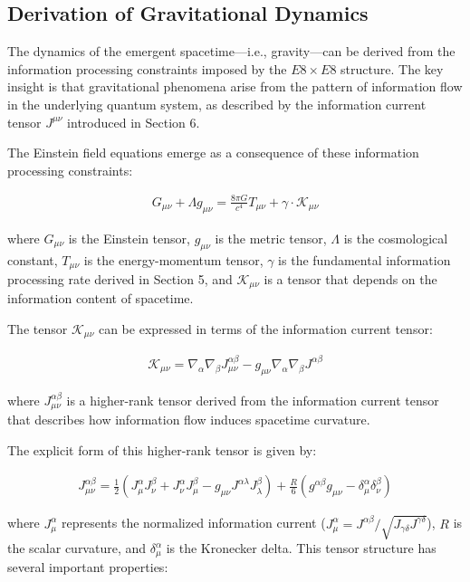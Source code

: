 \documentclass[11pt,english,twoside]{article}
\begin{document}
\subsection{Derivation of Gravitational Dynamics}

The dynamics of the emergent spacetime---i.e., gravity---can be derived from the information processing constraints imposed by the $E8\times E8$ structure. The key insight is that gravitational phenomena arise from the pattern of information flow in the underlying quantum system, as described by the information current tensor $J^{\mu\nu}$ introduced in Section 6.

The Einstein field equations emerge as a consequence of these information processing constraints:

\begin{align}
    G_{\mu\nu} + \Lambda g_{\mu\nu} = \frac{8\pi G}{c^4} T_{\mu\nu} + \gamma \cdot \mathcal{K}_{\mu\nu}
\end{align}

where $G_{\mu\nu}$ is the Einstein tensor, $g_{\mu\nu}$ is the metric tensor, $\Lambda$ is the cosmological constant, $T_{\mu\nu}$ is the energy-momentum tensor, $\gamma$ is the fundamental information processing rate derived in Section 5, and $\mathcal{K}_{\mu\nu}$ is a tensor that depends on the information content of spacetime.

The tensor $\mathcal{K}_{\mu\nu}$ can be expressed in terms of the information current tensor:

\begin{align}
    \mathcal{K}_{\mu\nu} = \nabla_\alpha \nabla_\beta J^{\alpha\beta}_{\mu\nu} - g_{\mu\nu} \nabla_\alpha \nabla_\beta J^{\alpha\beta}
\end{align}

where $J^{\alpha\beta}_{\mu\nu}$ is a higher-rank tensor derived from the information current tensor that describes how information flow induces spacetime curvature.

The explicit form of this higher-rank tensor is given by:

\begin{align}
    J^{\alpha\beta}_{\mu\nu} = \frac{1}{2}\left(J^{\alpha}_{\mu}J^{\beta}_{\nu} + J^{\alpha}_{\nu}J^{\beta}_{\mu} - g_{\mu\nu}J^{\alpha\lambda}J^{\beta}_{\lambda}\right) + \frac{R}{6}\left(g^{\alpha\beta}g_{\mu\nu} - \delta^{\alpha}_{\mu}\delta^{\beta}_{\nu}\right)
\end{align}

where $J^{\alpha}_{\mu}$ represents the normalized information current ($J^{\alpha}_{\mu} = J^{\alpha\beta}/\sqrt{J_{\gamma\delta}J^{\gamma\delta}}$), $R$ is the scalar curvature, and $\delta^{\alpha}_{\mu}$ is the Kronecker delta. This tensor structure has several important properties:
\end{document}

